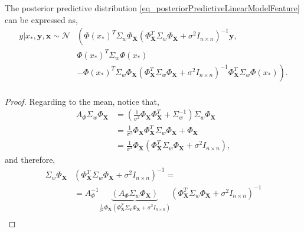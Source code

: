 \begin{proposition}
  The posterior predictive distribution \ref{eq_posteriorPredictiveLinearModelFeature} can be expressed as,
  \begin{equation} \label{eq_goodPosteriorPredictiveLinearModelfeature}
    \begin{aligned}
      y | x_*, \pmb{y}, \pmb{x}
        \sim \mathcal{N} %
             & \left( \Phi(x_*)^T \Sigma_w \Phi_{\pmb{X}} 
               \left( \Phi_{\pmb{X}}^T \Sigma_w \Phi_{\pmb{X}} + \sigma^2 I_{n \times n} \right)^{-1} \pmb{y} , \right. \\
             &\Phi(x_*)^T \Sigma_w \Phi(x_*) \\
             &\left. - \Phi(x_*)^T \Sigma_w \Phi_{\pmb{X}}
               \left( \Phi_{\pmb{X}}^T \Sigma_w \Phi_{\pmb{X}} + \sigma^2 I_{n \times n} \right)^{-1}
               \Phi_{\pmb{X}}^T \Sigma_w \Phi(x_*) 
                         \right). \\
    \end{aligned}
  \end{equation} 
    \begin{proof}
      Regarding to the mean, notice that,
      \begin{equation*}
        \begin{aligned}
          A_{\Phi} \Sigma_w \Phi_{\pmb{X}} &= \left( \frac{1}{\sigma^2}\Phi_{\pmb{X}}\Phi_{\pmb{X}}^T + \Sigma_w^{-1} \right) \Sigma_w \Phi_{\pmb{X}} \\
            &= \frac{1}{\sigma^2}\Phi_{\pmb{X}}\Phi_{\pmb{X}}^T\Sigma_w \Phi_{\pmb{X}} + \Phi_{\pmb{X}} \\
            &= \frac{1}{\sigma^2}\Phi_{\pmb{X}} \left( \Phi_{\pmb{X}}^T\Sigma_w \Phi_{\pmb{X}} + \sigma^2 I_{n \times n} \right),
        \end{aligned} 
      \end{equation*}
    and therefore,
      \begin{equation*}
        \begin{aligned}
          \Sigma_w \Phi_{\pmb{X}} &\left( \Phi_{\pmb{X}}^T \Sigma_w \Phi_{\pmb{X}} + \sigma^2 I_{n \times n} \right)^{-1} = \\
            &= A_{\Phi}^{-1} 
            \underbrace{\left( A_{\Phi} \Sigma_w \Phi_{\pmb{X}} \right)}
            _{\frac{1}{\sigma^2}\Phi_{\pmb{X}} \left( \Phi_{\pmb{X}}^T\Sigma_w \Phi_{\pmb{X}} + \sigma^2 I_{n \times n} \right)} 
            \left( \Phi_{\pmb{X}}^T \Sigma_w \Phi_{\pmb{X}} + \sigma^2 I_{n \times n} \right)^{-1} \\

\end{aligned}
\end{equation*}
\end{proof}
\end{proposition}
